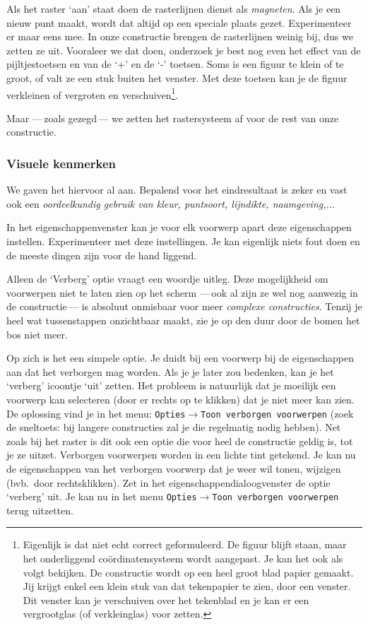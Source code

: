 Als het raster `aan' staat doen de rasterlijnen dienst als \emph{magneten}. Als je een nieuw punt maakt, wordt dat altijd op een speciale plaats gezet. Experimenteer er maar eens mee. 
In onze constructie brengen de rasterlijnen weinig bij, dus we zetten ze uit. Vooraleer we dat doen, onderzoek je best nog even het effect van de pijltjestoetsen en van de `+' en de `-' toetsen. Soms is een figuur te klein of te groot, of valt ze een stuk buiten het venster. Met deze toetsen kan je de figuur verkleinen of vergroten en verschuiven\footnote{Eigenlijk is dat niet echt correct geformuleerd. De figuur blijft staan, maar het onderliggend co\"{o}rdinatensysteem wordt aangepast. Je kan het ook als volgt bekijken. De constructie wordt op een heel groot blad papier gemaakt. Jij krijgt enkel een klein stuk van dat tekenpapier te zien, door een venster. Dit venster kan je verschuiven over het tekenblad en je kan er een vergrootglas (of verkleinglas) voor zetten.}.

Maar ---\,zoals gezegd\,--- we zetten het rastersysteem af voor de rest van onze constructie.

\subsubsection{Visuele kenmerken}
We gaven het hiervoor al aan. Bepalend voor het eindresultaat is zeker en vast ook een \emph{oordeelkundig gebruik van kleur, puntsoort, lijndikte, naamgeving,...}

In het eigenschappenvenster kan je voor elk voorwerp apart deze eigenschappen instellen. Experimenteer met deze instellingen. Je kan eigenlijk niets fout doen en de meeste dingen zijn voor de hand liggend.

Alleen de `Verberg' optie vraagt een woordje uitleg. Deze mogelijkheid om voorwerpen niet te laten zien op het scherm ---\,ook al zijn ze wel nog aanwezig in de constructie\,--- is absoluut onmisbaar voor meer \emph{complexe constructies}. Tenzij je heel wat tussenstappen onzichtbaar maakt, zie je op den duur door de bomen het bos niet meer. 

Op zich is het een simpele optie. Je duidt bij een voorwerp bij de eigenschappen aan dat het verborgen mag worden. Als je je later zou bedenken, kan je het `verberg' icoontje `uit' zetten. Het probleem is natuurlijk dat je moeilijk een voorwerp kan selecteren (door er rechts op te klikken) dat je niet meer kan zien. De oplossing vind je in het menu: \texttt{Opties$\rightarrow$Toon verborgen voorwerpen} (zoek de sneltoets: bij langere constructies zal je die regelmatig nodig hebben). Net zoals bij het raster is dit ook een optie die voor heel de constructie geldig is, tot je ze uitzet. Verborgen voorwerpen worden in een lichte tint getekend. Je kan nu de eigenschappen van het verborgen voorwerp dat je weer wil tonen, wijzigen (bvb.\ door rechtsklikken). Zet in het eigenschappendialoogvenster de optie `verberg' uit. Je kan nu in het menu \texttt{Opties$\rightarrow$Toon verborgen voorwerpen} terug uitzetten.



